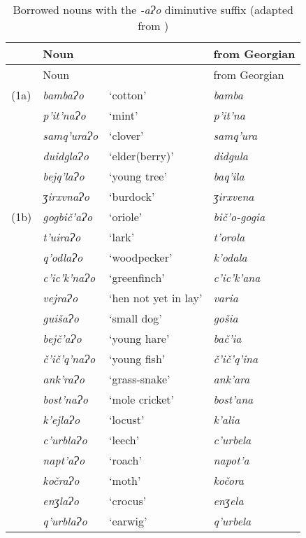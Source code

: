 	\begin{longtable}{llll}
    \caption{Borrowed nouns with the \textit{-aɁo} diminutive suffix (adapted from \textcite{kadagidze87ao})} \label{table-diminutivegeo1}\\
    \lsptoprule
    	& {Noun} & & {from Georgian} \\
	\midrule
	\endfirsthead
	\midrule
    	& {Noun} & & {from Georgian} \\
	\midrule
	\endhead
        

       (1a) & \textit{bambaɁo} & `cotton' & \textit{bamba} \\
			& \textit{p'it'naɁo} & `mint' & \textit{p'it'na} \\
			& \textit{samq'uraɁo} & `clover' & \textit{samq'ura} \\
			& \textit{duidglaɁo} & `elder(berry)' & \textit{didgula} \\
			& \textit{bejq'laɁo} & `young tree' & \textit{baq'ila} \\
			& \textit{ʒirxvnaɁo} & `burdock' & \textit{ʒirxvena} \\

        \midrule
        
	(1b) & \textit{gogbič'aɁo} & `oriole' & \textit{bič'o-gogia} \\
			& \textit{t'uiraɁo} & `lark' & \textit{t'orola} \\
			& \textit{q'odlaɁo} & `woodpecker' & \textit{k'odala} \\
			& \textit{c'ic'k'naɁo} & `greenfinch' & \textit{c'ic'k'ana} \\
			
			& \textit{vejraɁo} & `hen not yet in lay' & \textit{varia} \\
			& \textit{guišaɁo} & `small dog' & \textit{gošia} \\
			& \textit{bejč'aɁo} & `young hare' & \textit{bač'ia} \\
			& \textit{č'ič'q'naɁo} & `young fish' & \textit{č'ič'q'ina} \\
			
			& \textit{ank'raɁo} & `grass-snake' & \textit{ank'ara} \\
			
			& \textit{bost'naɁo} & `mole cricket' & \textit{bost'ana} \\
			& \textit{k'ejlaɁo} & `locust' & \textit{k'alia} \\
			& \textit{c'urblaɁo} & `leech' & \textit{c'urbela} \\
			& \textit{napt'aɁo} &  `roach' & \textit{napot'a} \\
			& \textit{kočraɁo} & `moth' &  \textit{kočora} \\
			& \textit{enʒlaɁo} & `crocus' & \textit{enʒela} \\
			& \textit{q'urblaɁo} & `earwig' & \textit{q'urbela} \\


\end{longtable}
